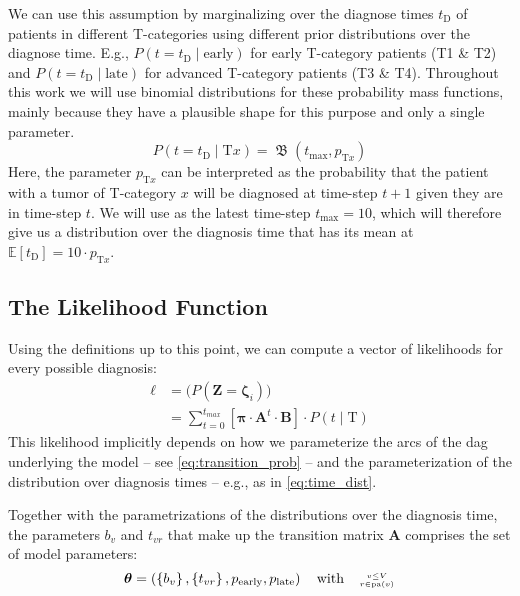 \documentclass[twocolumn]{aastex631}
\begin{document}
We can use this assumption by marginalizing over the diagnose times $t_\text{D}$ of patients in different T-categories using different prior distributions over the diagnose time. E.g., $P \left( t=t_\text{D} \mid \text{early} \right)$ for early T-category patients (T1 \& T2) and $P \left( t=t_\text{D} \mid \text{late} \right)$ for advanced T-category patients (T3 \& T4). Throughout this work we will use binomial distributions for these probability mass functions, mainly because they have a plausible shape for this purpose and only a single parameter.
%
\begin{equation} \label{eq:time_dist}
    P \left( t = t_\text{D} \mid \text{T}x \right) = \operatorname{\mathfrak{B}}(t_\text{max},p_{\text{T}x})
\end{equation}
%
Here, the parameter $p_{\text{T}x}$ can be interpreted as the probability that the patient with a tumor of T-category $x$ will be diagnosed at time-step $t+1$ given they are in time-step $t$. We will use as the latest time-step $t_\text{max} = 10$, which will therefore give us a distribution over the diagnosis time that has its mean at $\mathbb{E}[t_\text{D}] = 10 \cdot p_{\text{T}x}$.


\subsection{The Likelihood Function}
\label{subsec:formalism:likelihood}

Using the definitions up to this point, we can compute a vector of likelihoods for every possible diagnosis:
%
\begin{equation} \label{eq:likelihood_vec}
\begin{split}
    \boldsymbol{\ell} &= \big( P\left( \mathbf{Z} = \boldsymbol{\zeta}_i \right) \big) \\
    &= \sum_{t=0}^{t_{max}} \left[ \boldsymbol{\pi} \cdot \mathbf{A}^t \cdot \mathbf{B} \right] \cdot P \left( t \mid \text{T} \right)
\end{split}
\end{equation}
%
This likelihood implicitly depends on how we parameterize the arcs of the \gls{dag} underlying the model -- see \autoref{eq:transition_prob} -- and the parameterization of the distribution over diagnosis times -- e.g., as in \autoref{eq:time_dist}. 

Together with the parametrizations of the distributions over the diagnosis time, the parameters $b_v$ and $t_{vr}$ that make up the transition matrix $\mathbf{A}$ comprises the set of model parameters:
%
\begin{equation}
    \boldsymbol{\theta} = \left( \left\{ b_v \right\}, \left\{ t_{vr} \right\}, p_\text{early}, p_\text{late} \right) \quad \text{with} \quad \genfrac{}{}{0pt}{2}{v\leq V}{r\in\operatorname{pa}(v)}
\end{equation}
\end{document}
